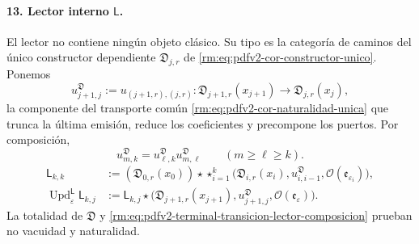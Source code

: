 \paragraph{13. Lector interno \(\mathsf L\).}
El lector no contiene ningún objeto clásico. Su tipo es la categoría de
caminos del único constructor dependiente
\(\mathfrak D_{j,r}\) de \eqref{rm:eq:pdfv2-cor-constructor-unico}. Ponemos
\begin{equation}
\label{rm:eq:pdfv2-terminal-transicion-lector-tipado}
 u^{\mathfrak D}_{j+1,j}
 :=u_{(j+1,r),(j,r)}:
 \mathfrak D_{j+1,r}(x_{j+1})
 \longrightarrow\mathfrak D_{j,r}(x_j),
\end{equation}
la componente del transporte común
\eqref{rm:eq:pdfv2-cor-naturalidad-unica} que trunca la última emisión, reduce
los coeficientes y precompone los puertos. Por composición,
\begin{equation}
\label{rm:eq:pdfv2-terminal-transicion-lector-composicion}
 u^{\mathfrak D}_{m,k}
 =u^{\mathfrak D}_{\ell,k}u^{\mathfrak D}_{m,\ell}
 \qquad(m\geq\ell\geq k).
\end{equation}
\begin{align}
 \mathsf L_{k,k}
 &:=(\mathfrak D_{0,r}(x_0))\star
 \mathop{\star}_{i=1}^{k}
 \bigl(\mathfrak D_{i,r}(x_i),u^{\mathfrak D}_{i,i-1},
       \mathcal O(\mathfrak e_{\varepsilon_i})\bigr),
 \label{rm:eq:pdfv2-terminal-semilla-l}\\
 \operatorname{Upd}^{\mathsf L}_{\varepsilon}\mathsf L_{k,j}
 &:=
 \mathsf L_{k,j}\star
 \bigl(\mathfrak D_{j+1,r}(x_{j+1}),
 u^{\mathfrak D}_{j+1,j},\mathcal O(\mathfrak e_\varepsilon)\bigr).
 \label{rm:eq:pdfv2-terminal-update-l}
\end{align}
La totalidad de \(\mathfrak D\) y
\eqref{rm:eq:pdfv2-terminal-transicion-lector-composicion} prueban no vacuidad
y naturalidad.

